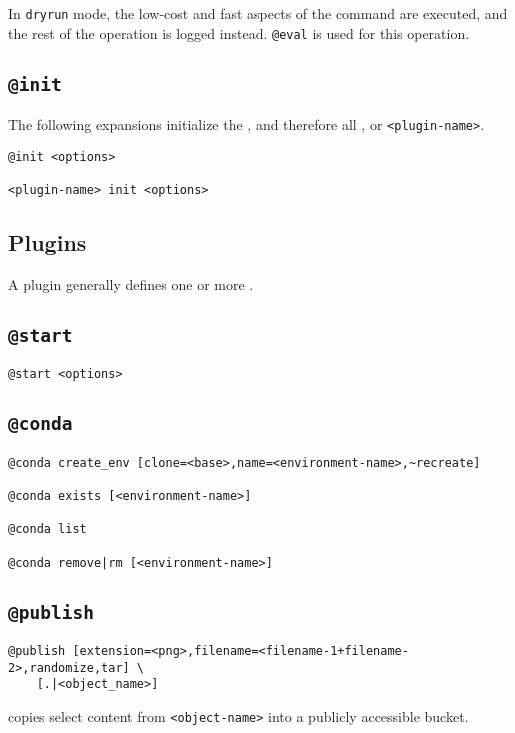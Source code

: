 In \texttt{dryrun} mode, the low-cost and fast aspects of the command are executed, and the rest of the operation is logged instead. \texttt{@eval} is used for this operation. 




\subsection{\texttt{@init}}
\label{init}

The following expansions initialize the , and therefore all , or \texttt{<plugin-name>}.
%
\begin{verbatim}
@init <options>

<plugin-name> init <options>
\end{verbatim}

\subsection{Plugins}
\label{plugins}

A plugin generally defines one or more .

\subsection{\texttt{@start}}
\label{start}

\begin{verbatim}
@start <options>
\end{verbatim}

\subsection{\texttt{@conda}}
\label{conda}

\begin{verbatim}
@conda create_env [clone=<base>,name=<environment-name>,~recreate]

@conda exists [<environment-name>]

@conda list

@conda remove|rm [<environment-name>]
\end{verbatim}

\subsection{\texttt{@publish}}
\label{publish}

\begin{verbatim}
@publish [extension=<png>,filename=<filename-1+filename-2>,randomize,tar] \
    [.|<object_name>]
\end{verbatim}
%
copies select content from \texttt{<object-name>} into a publicly accessible bucket.



